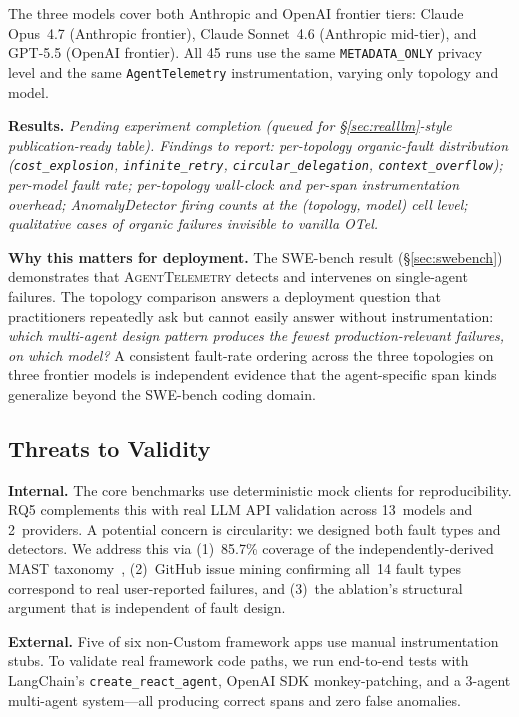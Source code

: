 \documentclass[11pt]{article}
\begin{document}
The three models cover both Anthropic and OpenAI frontier tiers:
Claude Opus~4.7 (Anthropic frontier), Claude Sonnet~4.6 (Anthropic
mid-tier), and GPT-5.5 (OpenAI frontier). All 45 runs use the same
\texttt{METADATA\_ONLY} privacy level and the same
\texttt{AgentTelemetry} instrumentation, varying only topology and
model.

\textbf{Results.} \emph{Pending experiment completion (queued for
\S\ref{sec:realllm}-style publication-ready table). Findings to
report: per-topology organic-fault distribution
(\texttt{cost\_explosion}, \texttt{infinite\_retry},
\texttt{circular\_delegation}, \texttt{context\_overflow}); per-model
fault rate; per-topology wall-clock and per-span instrumentation
overhead; AnomalyDetector firing counts at the (topology, model) cell
level; qualitative cases of organic failures invisible to vanilla
OTel.}

\textbf{Why this matters for deployment.} The SWE-bench result
(\S\ref{sec:swebench}) demonstrates that \textsc{AgentTelemetry}
detects and intervenes on single-agent failures. The topology
comparison answers a deployment question that practitioners
repeatedly ask but cannot easily answer without instrumentation:
\emph{which multi-agent design pattern produces the fewest
production-relevant failures, on which model?} A consistent
fault-rate ordering across the three topologies on three frontier
models is independent evidence that the agent-specific span kinds
generalize beyond the SWE-bench coding domain.

\subsection{Threats to Validity}

\textbf{Internal.}  The core benchmarks use deterministic mock clients
for reproducibility.  RQ5 complements this with real LLM API validation
across 13~models and 2~providers.  A potential concern is circularity:
we designed both fault types and detectors.  We address this via (1)~85.7\%
coverage of the independently-derived MAST taxonomy~\citep{mast},
(2)~GitHub issue mining confirming all~14 fault types correspond to
real user-reported failures, and (3)~the ablation's structural
argument that is independent of fault design.

\textbf{External.}  Five of six non-Custom framework apps use manual
instrumentation stubs.  To validate real framework code paths, we run
end-to-end tests with LangChain's \texttt{create\_react\_agent},
OpenAI SDK monkey-patching, and a 3-agent multi-agent system---all
producing correct spans and zero false anomalies.
\end{document}
